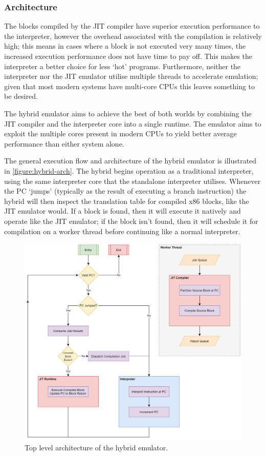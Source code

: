 \subsubsection{Architecture}
\label{section:hybrid-arch}

The blocks compiled by the JIT compiler have superior execution performance to the interpreter, however the overhead associated with the compilation is relatively high; this means in cases where a block is not executed very many times, the increased execution performance does not have time to pay off. This makes the interpreter a better choice for less `hot' programs. Furthermore, neither the interpreter nor the JIT emulator utilise multiple threads to accelerate emulation; given that most modern systems have multi-core CPUs this leaves something to be desired.

The hybrid emulator aims to achieve the best of both worlds by combining the JIT compiler and the interpreter core into a single runtime. The emulator aims to exploit the multiple cores present in modern CPUs to yield better average performance than either system alone.

The general execution flow and architecture of the hybrid emulator is illustrated in \autoref{figure:hybrid-arch}. The hybrid begins operation as a traditional interpreter, using the same interpreter core that the standalone interpreter utilises. Whenever the PC `jumps' (typically as the result of executing a branch instruction) the hybrid will then inspect the translation table for compiled x86 blocks, like the JIT emulator would. If a block is found, then it will execute it natively and operate like the JIT emulator; if the block isn't found, then it will schedule it for compilation on a worker thread before continuing like a normal interpreter.

\begin{figure}[h]
    \centering
    \includegraphics[width=1\linewidth]{diagrams/hybrid.png}
    \caption{Top level architecture of the hybrid emulator.}
    \label{figure:hybrid-arch}
\end{figure}


